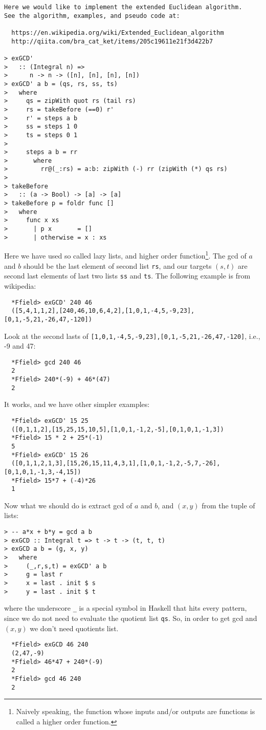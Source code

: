 \documentclass[11pt]{book}
\begin{document}
\label{extendedEuclideanAlgorithm}
\begin{verbatim}
Here we would like to implement the extended Euclidean algorithm.
See the algorithm, examples, and pseudo code at:

  https://en.wikipedia.org/wiki/Extended_Euclidean_algorithm
  http://qiita.com/bra_cat_ket/items/205c19611e21f3d422b7

> exGCD' 
>   :: (Integral n) => 
>      n -> n -> ([n], [n], [n], [n])
> exGCD' a b = (qs, rs, ss, ts)
>   where
>     qs = zipWith quot rs (tail rs)
>     rs = takeBefore (==0) r'
>     r' = steps a b
>     ss = steps 1 0
>     ts = steps 0 1
>
>     steps a b = rr
>       where 
>         rr@(_:rs) = a:b: zipWith (-) rr (zipWith (*) qs rs)
>
> takeBefore 
>   :: (a -> Bool) -> [a] -> [a]
> takeBefore p = foldr func []
>   where
>     func x xs 
>       | p x       = []
>       | otherwise = x : xs
\end{verbatim}
Here we have used so called lazy lists, and higher order function\footnote{
Naively speaking, the function whose inputs and/or outputs are functions is called a higher order function.
}.
The gcd of $a$ and $b$ should be the last element of second list \verb+rs+, and our targets $(s,t)$ are second last elements of last two lists \verb+ss+ and \verb+ts+.
The following example is from wikipedia:
\begin{verbatim}
  *Ffield> exGCD' 240 46
  ([5,4,1,1,2],[240,46,10,6,4,2],[1,0,1,-4,5,-9,23],[0,1,-5,21,-26,47,-120])
\end{verbatim}  
Look at the second lasts of \verb+[1,0,1,-4,5,-9,23],[0,1,-5,21,-26,47,-120]+, i.e., -9 and 47:
\begin{verbatim}  
  *Ffield> gcd 240 46
  2
  *Ffield> 240*(-9) + 46*(47)
  2
\end{verbatim}
It works, and we have other simpler examples:
\begin{verbatim}
  *Ffield> exGCD' 15 25
  ([0,1,1,2],[15,25,15,10,5],[1,0,1,-1,2,-5],[0,1,0,1,-1,3])
  *Ffield> 15 * 2 + 25*(-1)
  5
  *Ffield> exGCD' 15 26
  ([0,1,1,2,1,3],[15,26,15,11,4,3,1],[1,0,1,-1,2,-5,7,-26],[0,1,0,1,-1,3,-4,15])
  *Ffield> 15*7 + (-4)*26
  1
\end{verbatim}
Now what we should do is extract gcd of $a$ and $b$, and $(x, y)$ from the tuple of lists:
\begin{verbatim}
> -- a*x + b*y = gcd a b
> exGCD :: Integral t => t -> t -> (t, t, t)
> exGCD a b = (g, x, y)
>   where
>     (_,r,s,t) = exGCD' a b
>     g = last r
>     x = last . init $ s
>     y = last . init $ t
\end{verbatim}
where the underscore \verb+_+ is a special symbol in Haskell that hits every pattern, since we do not need to evaluate the quotient list \verb+qs+.
So, in order to get gcd and $(x, y)$ we don't need quotients list.
\begin{verbatim}
  *Ffield> exGCD 46 240
  (2,47,-9)
  *Ffield> 46*47 + 240*(-9)
  2
  *Ffield> gcd 46 240
  2
\end{verbatim}
\end{document}
